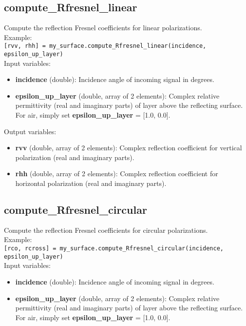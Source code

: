 \subsection{compute\_Rfresnel\_linear}

Compute the reflection Fresnel coefficients for linear polarizations.\\

Example:\\

\texttt{[rvv, rhh] = my\_surface.compute\_Rfresnel\_linear(incidence, epsilon\_up\_layer)}\\

Input variables:
\begin{itemize}
\item {\bf incidence} (double): Incidence angle of incoming signal in degrees.
\item {\bf epsilon\_up\_layer} (double, array of 2 elements): Complex relative permittivity (real and imaginary parts) of layer above the reflecting surface. For air, simply set {\bf epsilon\_up\_layer} = [1.0, 0.0].
\end{itemize}

Output variables:
\begin{itemize}
\item {\bf rvv} (double, array of 2 elements): Complex reflection coefficient for vertical polarization (real and imaginary parts).
\item {\bf rhh} (double, array of 2 elements): Complex reflection coefficient for horizontal polarization (real and imaginary parts).
\end{itemize}


\subsection{compute\_Rfresnel\_circular}

Compute the reflection Fresnel coefficients for circular polarizations.\\

Example:\\

\texttt{[rco, rcross] = my\_surface.compute\_Rfresnel\_circular(incidence, epsilon\_up\_layer)}\\

Input variables:
\begin{itemize}
\item {\bf incidence} (double): Incidence angle of incoming signal in degrees.
\item {\bf epsilon\_up\_layer} (double, array of 2 elements): Complex relative permittivity (real and imaginary parts) of layer above the reflecting surface. For air, simply set {\bf epsilon\_up\_layer} = [1.0, 0.0].
\end{itemize}

